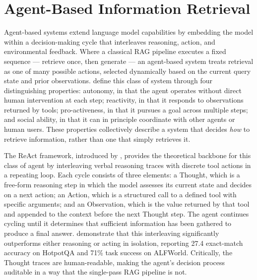 \section{Agent-Based Information Retrieval}

Agent-based systems extend language model capabilities by embedding the model within a decision-making cycle that interleaves reasoning, action, and environmental feedback. Where a classical RAG pipeline executes a fixed sequence — retrieve once, then generate — an agent-based system treats retrieval as one of many possible actions, selected dynamically based on the current query state and prior observations.  define this class of system through four distinguishing properties: autonomy, in that the agent operates without direct human intervention at each step; reactivity, in that it responds to observations returned by tools; pro-activeness, in that it pursues a goal across multiple steps; and social ability, in that it can in principle coordinate with other agents or human users. These properties collectively describe a system that decides \emph{how} to retrieve information, rather than one that simply retrieves it.

The ReAct framework, introduced by , provides the theoretical backbone for this class of agent by interleaving verbal reasoning traces with discrete tool actions in a repeating loop. Each cycle consists of three elements: a Thought, which is a free-form reasoning step in which the model assesses its current state and decides on a next action; an Action, which is a structured call to a defined tool with specific arguments; and an Observation, which is the value returned by that tool and appended to the context before the next Thought step. The agent continues cycling until it determines that sufficient information has been gathered to produce a final answer.  demonstrate that this interleaving significantly outperforms either reasoning or acting in isolation, reporting 27.4 exact-match accuracy on HotpotQA and 71\% task success on ALFWorld. Critically, the Thought traces are human-readable, making the agent's decision process auditable in a way that the single-pass RAG pipeline is not.

